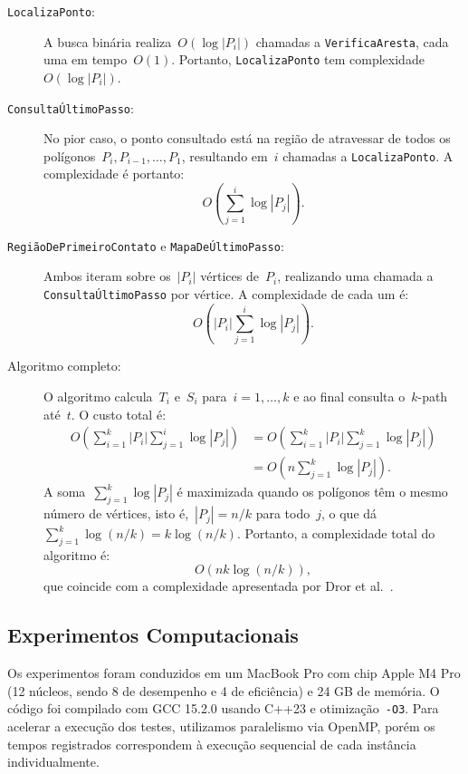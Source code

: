 \documentclass[11pt]{article}
\begin{document}
\begin{description}

\item[\texttt{LocalizaPonto}:] A busca binária realiza~\(O(\log|P_i|)\) chamadas a \texttt{VerificaAresta}, cada uma em tempo~\(O(1)\). Portanto, \texttt{LocalizaPonto} tem complexidade~\(O(\log|P_i|)\).

\item[\texttt{ConsultaÚltimoPasso}:] No pior caso, o ponto consultado está na região de atravessar de todos os polígonos~\(P_i, P_{i-1}, \dots, P_1\), resultando em~\(i\) chamadas a \texttt{LocalizaPonto}. A complexidade é portanto:
\[
	O\!\left(\sum_{j=1}^{i} \log|P_j|\right).
\]

\item[\texttt{RegiãoDePrimeiroContato} e \texttt{MapaDeÚltimoPasso}:] Ambos iteram sobre os~\(|P_i|\) vértices de~\(P_i\), realizando uma chamada a \texttt{ConsultaÚltimoPasso} por vértice. A complexidade de cada um é:
\[
	O\!\left(|P_i| \sum_{j=1}^{i} \log|P_j|\right).
\]

\item[Algoritmo completo:] O algoritmo calcula~\(T_i\) e~\(S_i\) para~\(i = 1, \dots, k\) e ao final consulta o~\(k\)-path até~\(t\). O custo total é:
\begin{align*}
	O\!\left(\sum_{i=1}^{k} |P_i| \sum_{j=1}^{i} \log|P_j|\right)
	&= O\!\left(\sum_{i=1}^{k} |P_i| \sum_{j=1}^{k} \log|P_j|\right) \\
	&= O\!\left(n \sum_{j=1}^{k} \log|P_j|\right).
\end{align*}
A soma~\(\sum_{j=1}^{k} \log|P_j|\) é maximizada quando os polígonos têm o mesmo número de vértices, isto é,~\(|P_j| = n/k\) para todo~\(j\), o que dá~\(\sum_{j=1}^{k} \log(n/k) = k\log(n/k)\). Portanto, a complexidade total do algoritmo é:
\[
	O\!\left(nk\log(n/k)\right),
\]
que coincide com a complexidade apresentada por Dror et al.~\cite{tpp-dror-2003}.

\end{description}

\subsection{Experimentos Computacionais}

Os experimentos foram conduzidos em um MacBook Pro com chip Apple M4 Pro (12 núcleos, sendo 8 de desempenho e 4 de eficiência) e 24 GB de memória. O código foi compilado com GCC 15.2.0 usando C++23 e otimização~\texttt{-O3}. Para acelerar a execução dos testes, utilizamos paralelismo via OpenMP, porém os tempos registrados correspondem à execução sequencial de cada instância individualmente.
\end{document}
